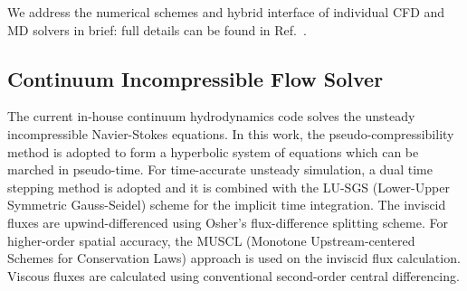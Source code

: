 \documentclass[]{aiaa-tc}%
\begin{document}
We address the numerical schemes and hybrid interface of individual CFD and MD
solvers in brief: full details can be found in Ref.~.

\subsection{Continuum Incompressible Flow Solver}
\label{sec:numerics_cfd}

The current in-house continuum hydrodynamics code solves the unsteady 
incompressible Navier-Stokes equations. In this work, the pseudo-compressibility 
method\cite{PseudoCompressibility} is adopted to form a hyperbolic system of 
equations which can be marched in pseudo-time.
For time-accurate unsteady simulation, a dual time stepping method is adopted 
and it is combined with the LU-SGS (Lower-Upper Symmetric Gauss-Seidel) scheme
\cite{LU-SGS} for the implicit time integration. The inviscid fluxes are 
upwind-differenced using Osher's flux-difference splitting scheme\cite{Osher}. 
For higher-order spatial accuracy, the MUSCL (Monotone Upstream-centered 
Schemes for Conservation Laws)\cite{MUSCL} approach is used on the inviscid 
flux calculation. Viscous fluxes are calculated using conventional 
second-order central differencing.





\end{document}

